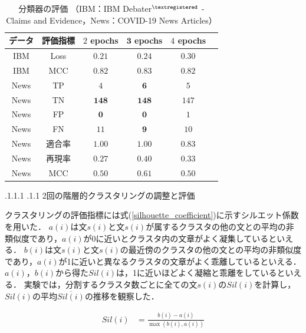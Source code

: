 \documentclass[a4paper, twocolumn, 10pt]{jarticle}
\makeatletter
\def\subsection{%
	\@startsection{subsection}{1}{\z@}%
	{.1\Cvs \@plus.1\Cdp \@minus.1\Cdp}%
	{.1\Cvs \@plus.1\Cdp}%
	{\normalfont\normalsize\bfseries}%
}
\makeatother
\begin{document}
\begin{table}[H]
  \caption{
    分類器の評価
    （IBM：IBM Debater$^{\textregistered}$ - Claims and Evidence，News：COVID-19 News Articles）
    }
  \centering
  {\tabcolsep=0.15cm
    \begin{tabular}{cccccp{6cm}}
    \hline
    データ & 評価指標 & $2$ epochs & $\mathbf{3}$ \textbf{epochs} & $4$ epochs
    \\
    \hline
    IBM & Loss & $\mathbf{0.21}$ & $0.24$ & $0.30$
    \\
    IBM & MCC & $0.82$ & $\mathbf{0.83}$ & $0.82$
    \\
    News & TP & $4$ & $\mathbf{6}$ & $5$
    \\
    News & TN & $\mathbf{148}$ & $\mathbf{148}$ & $147$
    \\
    News & FP & $\mathbf{0}$ & $\mathbf{0}$ & $1$
    \\
    News & FN & $11$ & $\mathbf{9}$ & $10$
    \\
    News & 適合率 & $\mathbf{1.00}$ & $\mathbf{1.00}$ & $0.83$
    \\
    News & 再現率 & $0.27$ & $\mathbf{0.40}$ & $0.33$
    \\
    News & MCC & $0.50$ & $\mathbf{0.61}$ & $0.50$
    \\
    \hline
    \end{tabular}
  }
  \label{classification_evaluation}
\end{table}

\subsection{2回の階層的クラスタリングの調整と評価}

クラスタリングの評価指標には式(\ref{silhouette_coefficient})に示すシルエット係数を用いた．
$a(i)$は文$s(i)$と文$s(i)$が属するクラスタの他の文との平均の非類似度であり，$a(i)$が0に近いとクラスタ内の文章がよく凝集しているといえる．
$b(i)$は文$s(i)$と文$s(i)$の最近傍のクラスタの他の文との平均の非類似度であり，$a(i)$が1に近いと異なるクラスタの文章がよく乖離しているといえる．
$a(i)$，$b(i)$から得た$Sil(i)$は，1に近いほどよく凝縮と乖離をしているといえる．
実験では，分割するクラスタ数ごとに全ての文$s(i)$の$Sil(i)$を計算し，$Sil(i)$の平均$\overline{Sil(i)}$の推移を観察した．

\begin{align}
  Sil(i) &= \frac{b(i) - a(i)}{\max ( b(i) , a(i))}
  \label{silhouette_coefficient}
\end{align}
\end{document}
